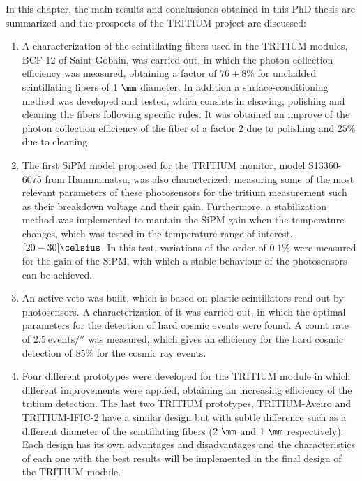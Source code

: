 In this chapter, the main results and conclusiones obtained in this PhD thesis are summarized and the prospects of the TRITIUM project are discussed:

\begin{enumerate}
\item{} A characterization of the scintillating fibers used in the TRITIUM modules, BCF-12 of Saint-Gobain, was carried out, in which the photon collection efficiency was measured, obtaining a factor of $76 \pm 8 \%$ for uncladded scintillating fibers of $1~\mm$ diameter. In addition a surface-conditioning method was developed and tested, which consists in cleaving, polishing and cleaning the fibers following specific rules. It was obtained an improve of the photon collection efficiency of the fiber of a factor $2$ due to polishing and $25\%$ due to cleaning.

\item{} The first SiPM model proposed for the TRITIUM monitor, model S13360-6075 from Hammamatsu, was also characterized, measuring some of the most relevant parameters of these photosensors for the tritium measurement such as their breakdown voltage and their gain. Furthermore, a stabilization method was implemented to mantain the SiPM gain when the temperature changes, which was tested in the temperature range of interest, $[20-30]\celsius$. In this test, variations of the order of $0.1\%$  were measured for the gain of the SiPM, with which a stable behaviour of the photosensors can be achieved.

\item{} An active veto was built, which is based on plastic scintillators read out by photosensors. A characterization of it was carried out, in which the optimal parameters for the detection of hard cosmic events were found. A count rate of $2.5~\text{events}/\second$ was measured, which gives an efficiency for the hard cosmic detection of $85\%$ for the cosmic ray events.

\item{} Four different prototypes were developed for the TRITIUM module in which different improvements were applied, obtaining an increasing efficiency of the tritium detection. The last two TRITIUM prototypes, TRITIUM-Aveiro and TRITIUM-IFIC-2 have a similar design but with subtle difference such as a different diameter of the scintillating fibers ($2~\mm$ and $1~\mm$ respectively). Each design has its own advantages and disadvantages and the characteristics of each one with the best results will be implemented in the final design of the TRITIUM module.


\end{enumerate}
